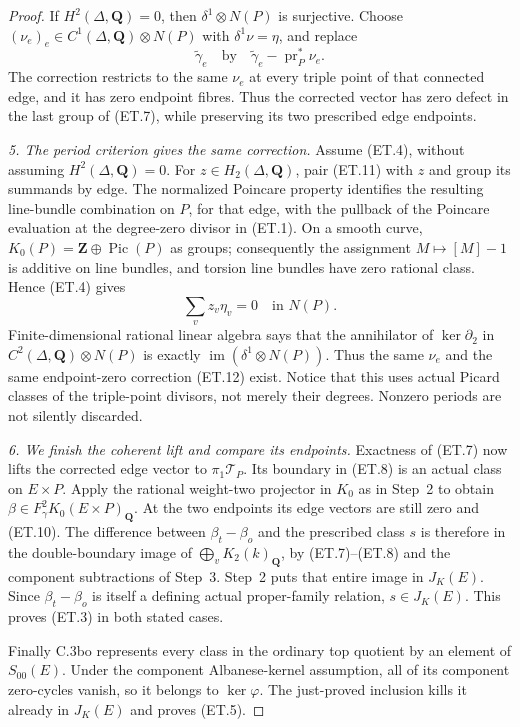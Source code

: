 \begin{proof}
If $H^2(\Delta,\mathbf Q)=0$, then
$\delta^1\otimes N(P)$ is surjective. Choose
$(\nu_e)_e\in C^1(\Delta,\mathbf Q)\otimes N(P)$ with
$\delta^1\nu=\eta$, and replace
\begin{equation}
       \widetilde\gamma_e\quad\text{by}\quad
       \widetilde\gamma_e-\operatorname{pr}_P^*\nu_e.
                                                        \tag{ET.12}
\end{equation}
The correction restricts to the same $\nu_e$ at every triple point
of that connected edge, and it has zero endpoint fibres. Thus the
corrected vector has zero defect in the last group of (ET.7), while
preserving its two prescribed edge endpoints.

\emph{5. The period criterion gives the same correction.}
Assume (ET.4), without assuming $H^2(\Delta,\mathbf Q)=0$.
For $z\in H_2(\Delta,\mathbf Q)$, pair (ET.11) with $z$ and group
its summands by edge. The normalized Poincare property identifies
the resulting line-bundle combination on $P$, for that edge, with
the pullback of the Poincare evaluation at the degree-zero divisor
in (ET.1). On a smooth curve,
$K_0(P)=\mathbf Z\oplus\operatorname{Pic}(P)$ as groups; consequently
the assignment $M\mapsto[M]-1$ is additive on line bundles, and
torsion line bundles have zero rational class. Hence (ET.4) gives
\[
                       \sum_v z_v\eta_v=0
                          \quad\text{in }N(P).
\]
Finite-dimensional rational linear algebra says that the annihilator
of $\ker\partial_2$ in $C^2(\Delta,\mathbf Q)\otimes N(P)$ is exactly
$\operatorname{im}(\delta^1\otimes N(P))$. Thus the same $\nu_e$ and
the same endpoint-zero correction (ET.12) exist. Notice that this
uses actual Picard classes of the triple-point divisors, not merely
their degrees. Nonzero periods are not silently discarded.

\emph{6. We finish the coherent lift and compare its endpoints.}
Exactness of (ET.7) now lifts the corrected edge vector to
$\pi_1\mathcal T_P$. Its boundary in (ET.8) is an actual class on
$E\times P$. Apply the rational weight-two projector in $K_0$ as
in Step~2 to obtain $\beta\in F_\gamma^2K_0(E\times P)_{\mathbf Q}$.
At the two endpoints its edge vectors are still zero and (ET.10).
The difference between $\beta_t-\beta_o$ and the prescribed class
$s$ is therefore in the double-boundary image of
$\bigoplus_vK_2(k)_{\mathbf Q}$, by (ET.7)--(ET.8) and the component
subtractions of Step~3. Step~2 puts that entire image in $J_K(E)$.
Since $\beta_t-\beta_o$ is itself a defining actual proper-family
relation, $s\in J_K(E)$. This proves (ET.3) in both stated cases.

Finally C.3bo represents every class in the ordinary top quotient
by an element of $S_{00}(E)$. Under the component Albanese-kernel
assumption, all of its component zero-cycles vanish, so it belongs
to $\ker\varphi$. The just-proved inclusion kills it already in
$J_K(E)$ and proves (ET.5).
\end{proof}

